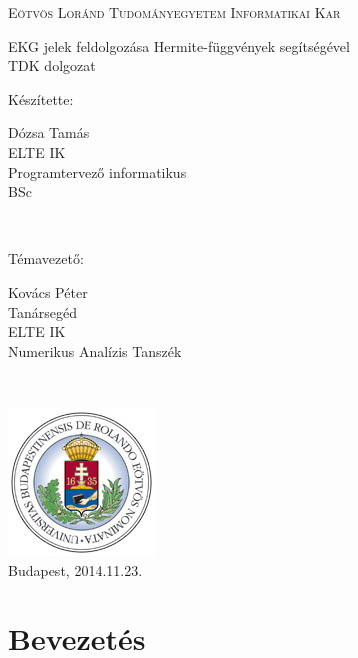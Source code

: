 \documentclass[oneside,titlepage,12pt,a4paper]{report}
\begin{document}
\begin{titlepage}
	\parbox[t]{5.5cm}{\vspace{1cm}}
\begin{center}
	\large
	\textsc{Eötvös Loránd Tudományegyetem \linebreak Informatikai Kar} \\[2cm]
\end{center}

\begin{center}
	\LARGE EKG jelek feldolgozása Hermite-függvények segítségével\\[0.55cm]
	\large TDK dolgozat \\[1.9cm]
\end{center}

\begin{center}
	\parbox[t]{25mm}{Készítette:}
	\parbox[t]{5.5cm}
		{Dózsa Tamás\\
		ELTE IK\\
		Programtervező informatikus \\
		BSc
		}
	\\[0.9cm]
	
  \parbox[t]{25mm}{Témavezető:}
	\parbox[t]{5.5cm}{
		Kovács Péter\\
		Tanársegéd\\
		ELTE IK\\
		Numerikus Analízis Tanszék
		}
	\\[4cm]
\end{center}

\begin{center}
	\includegraphics[scale=0.7]{./Abrak/Egyeb/elte_logo.jpg}\\[1cm]
	Budapest, 2014.11.23.
\end{center}
\end{titlepage}

\tableofcontents


\onehalfspacing
\chapter{Bevezetés}
\label{chap:Intro}
\end{document}
